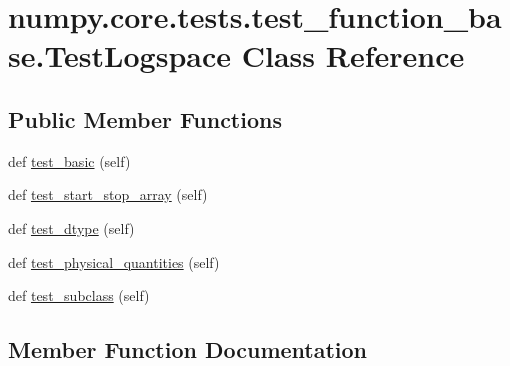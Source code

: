 \hypertarget{classnumpy_1_1core_1_1tests_1_1test__function__base_1_1TestLogspace}{}\section{numpy.\+core.\+tests.\+test\+\_\+function\+\_\+base.\+Test\+Logspace Class Reference}
\label{classnumpy_1_1core_1_1tests_1_1test__function__base_1_1TestLogspace}
\subsection*{Public Member Functions}
\begin{DoxyCompactItemize}
\item 
def \hyperlink{classnumpy_1_1core_1_1tests_1_1test__function__base_1_1TestLogspace_abd1f2679129e8bf1b7440251cefe0da5}{test\+\_\+basic} (self)
\item 
def \hyperlink{classnumpy_1_1core_1_1tests_1_1test__function__base_1_1TestLogspace_aae78695dff92a75c93709092810b3f4d}{test\+\_\+start\+\_\+stop\+\_\+array} (self)
\item 
def \hyperlink{classnumpy_1_1core_1_1tests_1_1test__function__base_1_1TestLogspace_a31e42a715e48317e59177afd4a711d99}{test\+\_\+dtype} (self)
\item 
def \hyperlink{classnumpy_1_1core_1_1tests_1_1test__function__base_1_1TestLogspace_a432ff770e7618e6207c4a67c9efc0c19}{test\+\_\+physical\+\_\+quantities} (self)
\item 
def \hyperlink{classnumpy_1_1core_1_1tests_1_1test__function__base_1_1TestLogspace_a039acafc7015a7c1bfcb8eb98fca1cb5}{test\+\_\+subclass} (self)
\end{DoxyCompactItemize}


\subsection{Member Function Documentation}
\mbox{\label{classnumpy_1_1core_1_1tests_1_1test__function__base_1_1TestLogspace_abd1f2679129e8bf1b7440251cefe0da5}} 
